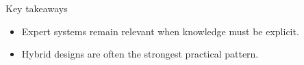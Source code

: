 \documentclass[aspectratio=169,11pt]{beamer}
\begin{document}

\begin{frame}{Key takeaways}
  \begin{itemize}
    \item Expert systems remain relevant when knowledge must be explicit.
    \item Hybrid designs are often the strongest practical pattern.
  \end{itemize}
\end{frame}
\end{document}
